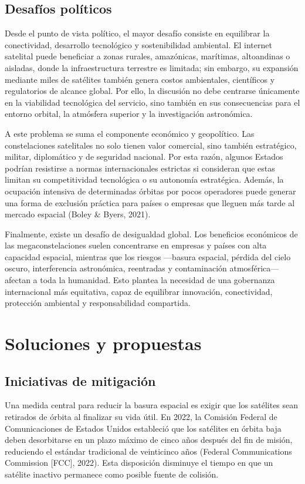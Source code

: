 \subsection{Desafíos políticos}

Desde el punto de vista político, el mayor desafío consiste en equilibrar la conectividad, desarrollo tecnológico y sostenibilidad ambiental. El internet satelital puede beneficiar a zonas rurales, amazónicas, marítimas, altoandinas o aisladas, donde la infraestructura terrestre es limitada; sin embargo, su expansión mediante miles de satélites también genera costos ambientales, científicos y regulatorios de alcance global. Por ello, la discusión no debe centrarse únicamente en la viabilidad tecnológica del servicio, sino también en sus consecuencias para el entorno orbital, la atmósfera superior y la investigación astronómica.

A este problema se suma el componente económico y geopolítico. Las constelaciones satelitales no solo tienen valor comercial, sino también estratégico, militar, diplomático y de seguridad nacional. Por esta razón, algunos Estados podrían resistirse a normas internacionales estrictas si consideran que estas limitan su competitividad tecnológica o su autonomía estratégica. Además, la ocupación intensiva de determinadas órbitas por pocos operadores puede generar una forma de exclusión práctica para países o empresas que lleguen más tarde al mercado espacial (Boley \& Byers, 2021).

Finalmente, existe un desafío de desigualdad global. Los beneficios económicos de las megaconstelaciones suelen concentrarse en empresas y países con alta capacidad espacial, mientras que los riesgos —basura espacial, pérdida del cielo oscuro, interferencia astronómica, reentradas y contaminación atmosférica— afectan a toda la humanidad. Esto plantea la necesidad de una gobernanza internacional más equitativa, capaz de equilibrar innovación, conectividad, protección ambiental y responsabilidad compartida. 

\section{Soluciones y propuestas}

\subsection{Iniciativas de mitigación}

Una medida central para reducir la basura espacial es exigir que los satélites sean retirados de órbita al finalizar su vida útil. En 2022, la Comisión Federal de Comunicaciones de Estados Unidos estableció que los satélites en órbita baja deben desorbitarse en un plazo máximo de cinco años después del fin de misión, reduciendo el estándar tradicional de veinticinco años (Federal Communications Commission [FCC], 2022). Esta disposición disminuye el tiempo en que un satélite inactivo permanece como posible fuente de colisión.

